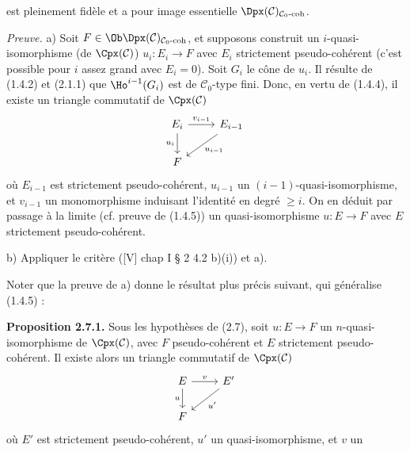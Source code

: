 est
pleinement fidèle et a pour image essentielle \(\Dpx(\mathcal C)_{\mathcal C_0\text{-}\mathrm{coh}}\).

\emph{Preuve.} a) Soit \(F\in\Ob\Dpx(\mathcal C)_{\mathcal C_0\text{-}\mathrm{coh}}\), et supposons construit un \(i\)-quasi-isomorphisme (de \(\Cpx(\mathcal C)\)) \(u_i:E_i\longrightarrow F\) avec \(E_i\) strictement pseudo-cohérent (c'est possible pour \(i\) assez grand avec \(E_i=0\)). Soit \(G_i\) le cône de \(u_i\). Il résulte de (1.4.2) et (2.1.1) que \(\Ho^{i-1}(G_i)\) est de \(\mathcal C_0\)-type fini. Donc, en vertu de (1.4.4), il existe un triangle commutatif de \(\Cpx(\mathcal C)\)
\[
\begin{tikzcd}
E_i \arrow[r,"v_{i-1}"] \arrow[d,"u_i"'] & E_{i-1} \arrow[dl,"u_{i-1}"]\\
F &
\end{tikzcd}
\]
où \(E_{i-1}\) est strictement pseudo-cohérent, \(u_{i-1}\) un \((i-1)\)-quasi-isomorphisme, et \(v_{i-1}\) un monomorphisme induisant l'identité en degré \(\geq i\). On en déduit par passage à la limite (cf. preuve de (1.4.5)) un quasi-isomorphisme \(u:E\to F\) avec \(E\) strictement pseudo-cohérent.

b) Appliquer le critère ([V] chap I § 2 4.2 b)(i)) et a).

Noter que la preuve de a) donne le résultat plus précis suivant, qui généralise (1.4.5) :

\textbf{Proposition 2.7.1.} Sous les hypothèses de (2.7), soit \(u:E\to F\) un \(n\)-quasi-isomorphisme de \(\Cpx(\mathcal C)\), avec \(F\) pseudo-cohérent et \(E\) strictement pseudo-cohérent. Il existe alors un triangle commutatif de \(\Cpx(\mathcal C)\)
\[
\begin{tikzcd}
E \arrow[r,"v"] \arrow[d,"u"'] & E' \arrow[dl,"u'"]\\
F &
\end{tikzcd}
\]
où \(E'\) est strictement pseudo-cohérent, \(u'\) un quasi-isomorphisme, et \(v\) un

